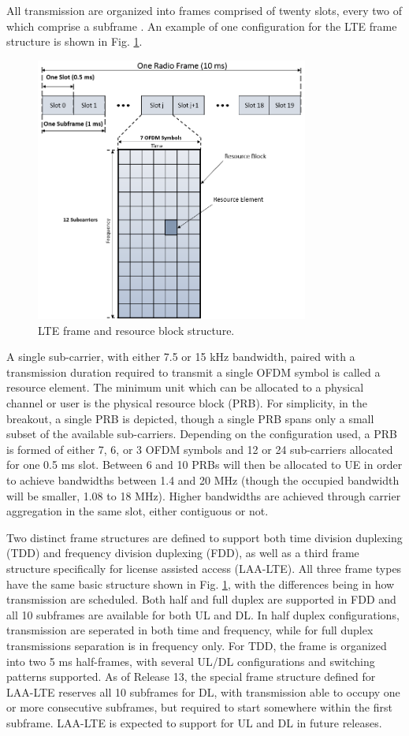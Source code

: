 All transmission are organized into frames comprised of twenty slots, every two of which comprise a subframe \cite{tr36211}. An example of one configuration for the LTE frame structure is shown in Fig. \ref{lte:frame}.
\begin{figure}[!t]
	\centering
	\includegraphics[width=0.8\textwidth]{figures3/LTE-frame}
	\caption{LTE frame and resource block structure.}
	\label{lte:frame}
\end{figure}
A single sub-carrier, with either 7.5 or 15 kHz bandwidth, paired with a transmission duration required to transmit a single OFDM symbol is called a resource element.  The minimum unit which can be allocated to a physical channel or user is the physical resource block (PRB).  For simplicity, in the breakout, a single PRB is depicted, though a single PRB spans only a small subset of the available sub-carriers. Depending on the configuration used, a PRB is formed of either 7, 6, or 3 OFDM symbols and 12 or 24 sub-carriers allocated for one 0.5 ms slot.  Between 6 and 10 PRBs will then be allocated to UE in order to achieve bandwidths between 1.4 and 20 MHz (though the occupied bandwidth will be smaller, 1.08 to 18 MHz).  Higher bandwidths are achieved through carrier aggregation in the same slot, either contiguous or not. 

Two distinct frame structures are defined to support both time division duplexing (TDD) and frequency division duplexing (FDD), as well as a third frame structure specifically for license assisted access (LAA-LTE).  All three frame types have the same basic structure shown in Fig. \ref{lte:frame}, with the differences being in how transmission are scheduled.  Both half and full duplex are supported in FDD and all 10 subframes are available for both UL and DL.  In half duplex configurations, transmission are seperated in both time and frequency, while for full duplex transmissions separation is in frequency only.  For TDD, the frame is organized into two 5 ms half-frames, with several UL/DL configurations and switching patterns supported.  As of Release 13, the special frame structure defined for LAA-LTE reserves all 10 subframes for DL, with transmission able to occupy one or more consecutive subframes, but required to start somewhere within the first subframe. LAA-LTE is expected to support for UL and DL in future releases.

